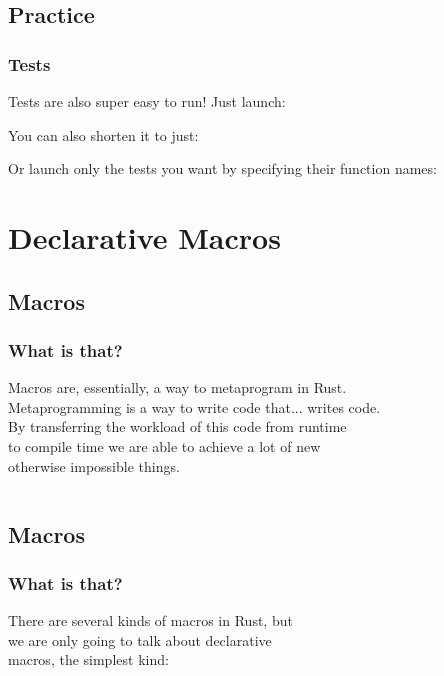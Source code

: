 \documentclass[usenames,twocolumn,dvipsnames,10pt,a4wide]{article}
\begin{document}
	\inputminted[fontsize=\normalsize]{rust}{code/list12.rs}
	


\subsection{Practice}
	\subsubsection{Tests}
	Tests are also super easy to run! Just launch:
	
	You can also shorten it to just: 
	
Or launch only the tests you want
by specifying their function names: 
	
\section{Declarative Macros}

\subsection{Macros}
	\subsubsection{What is that?}
	Macros are, essentially, a way to metaprogram in Rust.\\
	Metaprogramming is a way to write code that... writes code.\\
	By transferring the workload of this code from runtime\\
	to compile time we are able to achieve a lot of new\\
	otherwise impossible things.
	\inputminted[fontsize=\normalsize]{rust}{code/macros1.rs}

\subsection{Macros}
	\subsubsection{What is that?}
	There are several kinds of macros in Rust, but\\
	we are only going to talk about declarative\\
	macros, the simplest kind:
	\inputminted[fontsize=\normalsize]{rust}{code/macros2.rs}
\end{document}
